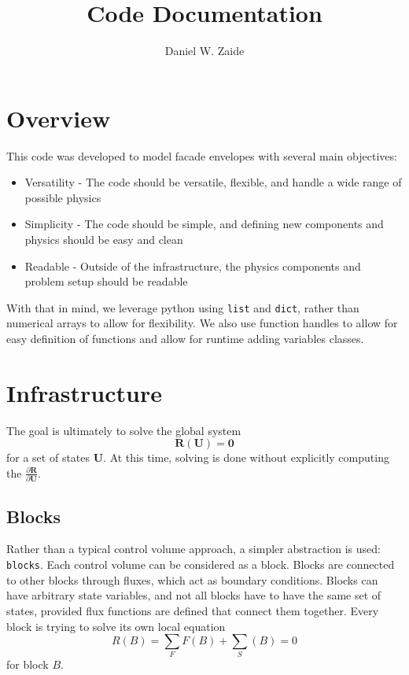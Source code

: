 \documentclass[11pt]{article}
\title{Code Documentation}
\author{Daniel W. Zaide}
\begin{document}
\maketitle

\section{Overview}

This code was developed to model facade envelopes with several main objectives:
\begin{itemize}
\item Versatility - The code should be versatile, flexible, and handle a wide range of possible physics
\item Simplicity - The code should be simple, and defining new components and physics should be easy and clean
\item Readable - Outside of the infrastructure, the physics components and problem setup should be readable
\end{itemize}

With that in mind, we leverage python using \lstinline{list} and \lstinline{dict}, rather than numerical arrays to allow for flexibility. We also use function handles to allow for easy definition of functions and allow for runtime adding variables classes.

\section{Infrastructure}
The goal is ultimately to solve the global system
\begin{equation}
\mathbf{R}(\mathbf{U}) = \mathbf{0}
\end{equation}
for a set of states $\mathbf{U}$. At this time, solving is done without explicitly computing the $\frac{\partial \mathbf{R}}{\partial \mathbf{U}}$.

\subsection{Blocks}
Rather than a typical control volume approach, a simpler abstraction is used: \lstinline{blocks}. Each control volume can be considered as a block. Blocks are connected to other blocks through fluxes, which act as boundary conditions. Blocks can have arbitrary state variables, and not all blocks have to have the same set of states, provided flux functions are defined that connect them together. Every block is trying to solve its own local equation
\begin{equation}
R(B) = \sum_F F(B) + \sum_S(B) = 0
\end{equation}
for block $B$.
\end{document}
